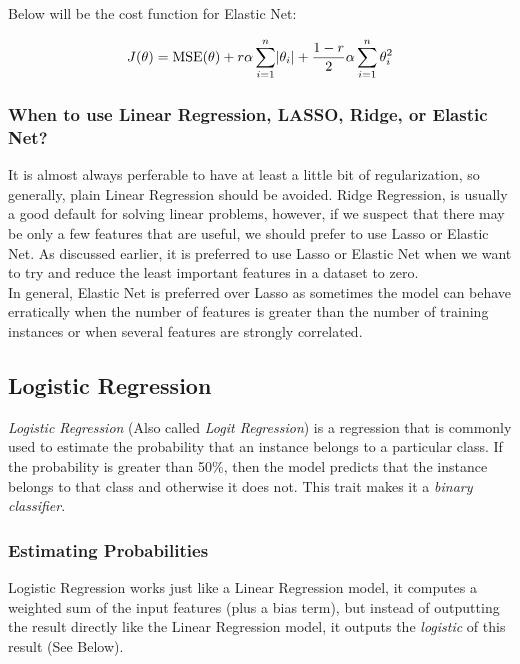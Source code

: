 \noindent 
Below will be the cost function for Elastic Net:

$$J(\mathbf{\theta}) = \text{MSE}(\mathbf{\theta}) + r\alpha \sum_{i=1}^{n} \abs{\theta_{i}} + \frac{1-r}{2} \alpha \sum_{i=1}^{n} \theta_{i}^{2}$$

\subsubsection{When to use Linear Regression, LASSO, Ridge, or Elastic Net?}

It is almost always perferable to have at least a little bit of regularization, so generally,
plain Linear Regression should be avoided. Ridge Regression, is usually a good default for solving
linear problems, however, if we suspect that there may be only a few features that are useful, we 
should prefer to use Lasso or Elastic Net. As discussed earlier, it is preferred to use Lasso or 
Elastic Net when we want to try and reduce the least important features in a dataset to zero. \\

\noindent 
In general, Elastic Net is preferred over Lasso as sometimes the model can behave 
erratically when the number of features is greater than the number of training instances or when
several features are strongly correlated. 

\subsection{Logistic Regression}

\textit{Logistic Regression} (Also called \textit{Logit Regression}) is a regression that is
commonly used to estimate the probability that an instance belongs to a particular class. If the 
probability is greater than 50\%, then the model predicts that the instance belongs to that class
and otherwise it does not. This trait makes it a \textit{binary classifier}.

\subsubsection{Estimating Probabilities}

Logistic Regression works just like a Linear Regression model, it computes a weighted sum of the
input features (plus a bias term), but instead of outputting the result directly like the Linear
Regression model, it outputs the \textit{logistic} of this result (See Below).


